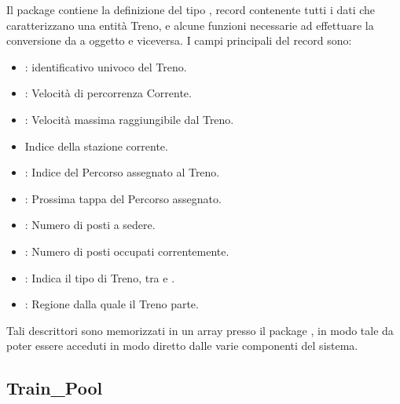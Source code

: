 	Il package  contiene la definizione del tipo , record contenente tutti i dati che caratterizzano una entità Treno, e alcune funzioni necessarie ad effettuare la conversione da  a oggetto  e viceversa.
	I campi principali del record  sono:
	\begin{itemize}
		\item {}: identificativo univoco del Treno.
		\item {}: Velocità di percorrenza Corrente.
	    \item {}: Velocità massima raggiungibile dal Treno.
	    \item {} Indice della stazione corrente.
	    \item {}: Indice del Percorso assegnato al Treno.
	    \item {}: Prossima tappa del Percorso assegnato.
	    \item {}: Numero di posti a sedere.
	    \item {}: Numero di posti occupati correntemente.
		\item {}: Indica il tipo di Treno, tra  e .
		\item {}: Regione dalla quale il Treno parte.
	\end{itemize}
	
	Tali descrittori sono memorizzati in un array  presso il package , in modo tale da poter essere acceduti in modo diretto dalle varie componenti del sistema.
	
	\subsection{Train\_Pool}
	
